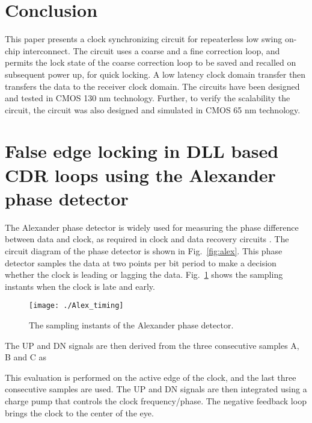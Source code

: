 \documentclass[journal,twoside,letterpaper]{IEEEtran}
\begin{document}
\section{Conclusion}
\label{sec:conclude}
This paper presents a clock synchronizing circuit for 
repeaterless low swing on-chip interconnect. The circuit uses a 
coarse and a fine correction loop, and permits the lock state of the
coarse correction loop to be saved and recalled on subsequent power up, 
for quick locking. A low latency clock domain transfer then
transfers the data to the receiver clock domain. The circuits have been designed
and tested in CMOS 130 nm technology. Further, to verify the scalability 
the circuit, the circuit was also designed and simulated in CMOS 65 nm technology.

\appendices
\section{False edge locking in DLL based CDR loops using the Alexander phase detector}
\label{app:APD}
The Alexander phase detector is widely used for measuring the phase
difference between data and clock, as required in clock and data
recovery circuits \cite{CDR_razavi}. The circuit diagram of the
phase detector is shown in \mbox{Fig. \ref{fig:alex}}.
This phase detector samples the data at two points per bit period to
make a decision whether the clock is leading or lagging the data.
\mbox{Fig. \ref{fig:alex_sample}} shows the sampling instants
when the clock is late and early.

\begin{figure}[htb!]
\centering
\texttt{[image: ./Alex\_timing]}
\caption{The sampling instants of the Alexander phase detector.}
\label{fig:alex_sample}
\end{figure}

The UP and DN signals are then derived
from the three consecutive samples A, B and C as


This evaluation is performed on the active edge of the clock,
and the last three consecutive samples are used.
The UP and DN signals are then integrated using a charge 
pump that controls the clock frequency/phase.
The negative feedback loop brings the clock to the 
center of the eye.
\end{document}
